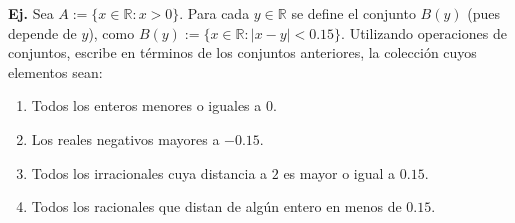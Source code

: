\documentclass[letterpaper,DIV=14,headsepline,12pt]{scrartcl}
\newcounter{Ejer}
\newcommand{\pts}{}
\newenvironment{ejercicio}[1]{\noindent
    \ifthenelse{\equal{#1}{1}}{\renewcommand{\pts}{\textbf{(#1 pt)}}}{\renewcommand{\pts}{\textbf{(#1 pts)}}}\textbf{Ej. \theEjer} \pts\stepcounter{Ejer}}{\vspace{.3cm}}
\begin{document}
    \begin{ejercicio}{1}
        Sea $A:=\{x \in \mathbb{R} : \text{$x > 0$} \}$. Para cada $y \in \mathbb{R}$ se define el conjunto $B(y)$ (pues depende de $y$), como $B(y):=\{x \in \mathbb{R} : |x-y|<0.15 \}$. Utilizando operaciones de conjuntos, escribe en términos de los conjuntos anteriores, la colección cuyos elementos sean:
        \begin{enumerate}
            \item Todos los enteros menores o iguales a $0$.
            \item Los reales negativos mayores a $-0.15$.
            \item Todos los irracionales cuya distancia a $2$ es mayor o igual a $0.15$.
            \item Todos los racionales que distan de algún entero en menos de $0.15$.
        \end{enumerate}
    \end{ejercicio}
\end{document}
